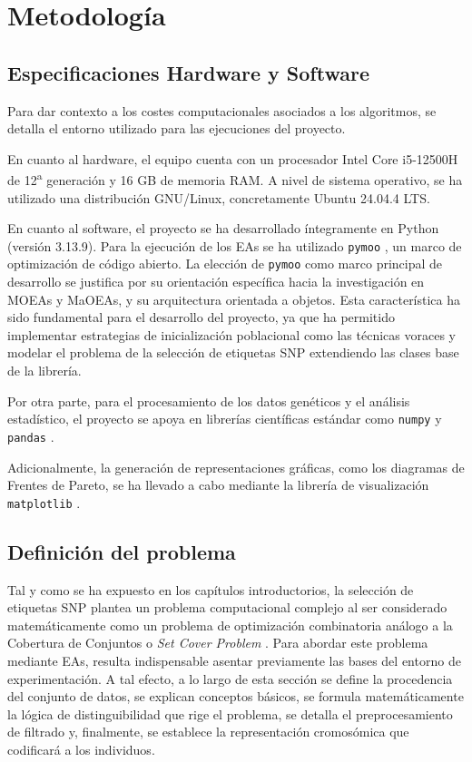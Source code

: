 \chapter{Metodología}

\section{Especificaciones Hardware y Software}

Para dar contexto a los costes computacionales asociados a los algoritmos, se detalla el entorno utilizado para las ejecuciones del proyecto.

En cuanto al hardware, el equipo cuenta con un procesador Intel Core i5-12500H de 12\textsuperscript{a} generación y 16 GB de memoria RAM. A nivel de sistema operativo, se ha utilizado una distribución GNU/Linux, concretamente Ubuntu 24.04.4 LTS.

En cuanto al software, el proyecto se ha desarrollado íntegramente en Python \cite{python} (versión 3.13.9). Para la ejecución de los EAs se ha utilizado \texttt{pymoo} \cite{pymoo}, un marco de optimización de código abierto. La elección de \texttt{pymoo} como marco principal de desarrollo se justifica por su orientación específica hacia la investigación en MOEAs y MaOEAs, y su arquitectura orientada a objetos. Esta característica ha sido fundamental para el desarrollo del proyecto, ya que ha permitido implementar estrategias de inicialización poblacional como las técnicas voraces y modelar el problema de la selección de etiquetas SNP extendiendo las clases base de la librería.

Por otra parte, para el procesamiento de los datos genéticos y el análisis estadístico, el proyecto se apoya en librerías científicas estándar como \texttt{numpy} \cite{numpy} y \texttt{pandas} \cite{pandas}.

Adicionalmente, la generación de representaciones gráficas, como los diagramas de Frentes de Pareto, se ha llevado a cabo mediante la librería de visualización \texttt{matplotlib} \cite{matplotlib}.

\section{Definición del problema}

Tal y como se ha expuesto en los capítulos introductorios, la selección de etiquetas SNP plantea un problema computacional complejo al ser considerado matemáticamente como un problema de optimización combinatoria análogo a la Cobertura de Conjuntos o \textit{Set Cover Problem} \cite{bafna2003haplotypes}. Para abordar este problema mediante EAs, resulta indispensable asentar previamente las bases del entorno de experimentación. A tal efecto, a lo largo de esta sección se define la procedencia del conjunto de datos, se explican conceptos básicos, se formula matemáticamente la lógica de distinguibilidad que rige el problema, se detalla el preprocesamiento de filtrado y, finalmente, se establece la representación cromosómica que codificará a los individuos.

